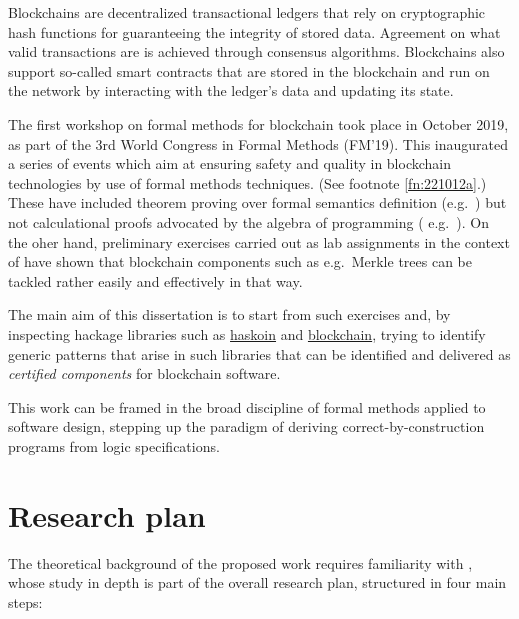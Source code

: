 \documentclass[a4paper, 11pt]{article} %
\begin{document}
Blockchains are decentralized transactional ledgers that rely on cryptographic hash functions for guaranteeing the integrity of stored data. Agreement on what valid transactions are is achieved through consensus algorithms. Blockchains also support so-called smart contracts that are stored in the blockchain and run on the network by interacting with the ledger’s data and updating its state. 

The first workshop on formal methods for blockchain took place in October 2019, as part of the 3rd World Congress in Formal Methods (FM'19). This inaugurated a series of events which aim at ensuring safety and quality in blockchain technologies by use of formal methods techniques. (See footnote \ref{fn:221012a}.) These have included theorem proving  over formal semantics definition (e.g.\ \cite{DBLP:conf/cav/GabbayJS21}) but not calculational proofs advocated by the algebra of programming ( e.g.\ \cite{BM97}). On the oher hand, preliminary exercises carried out as lab assignments in the context of \cite{Ol05} %
have shown that blockchain components such as e.g.\ Merkle trees \cite{DBLP:conf/crypto/Merkle87} can be tackled rather easily and effectively in that way.

The main aim of this dissertation is to start from such exercises and,
by inspecting hackage libraries such as \href{https://hackage.haskell.org/package/haskoin-core}{haskoin} and \href{https://hackage.haskell.org/package/blockchain}{blockchain}, trying to identify generic patterns that arise in such libraries that can be identified and delivered as \emph{certified components} for blockchain software.

This work can be framed in the broad discipline of formal methods applied to
software design, stepping up the paradigm of deriving correct-by-construction
programs from logic specifications.


\section*{Research plan}

The theoretical background of the proposed work requires familiarity with
\cite{BM97,Ol05}, whose study in depth is part of
the overall research plan, structured in four main steps:
\end{document}
